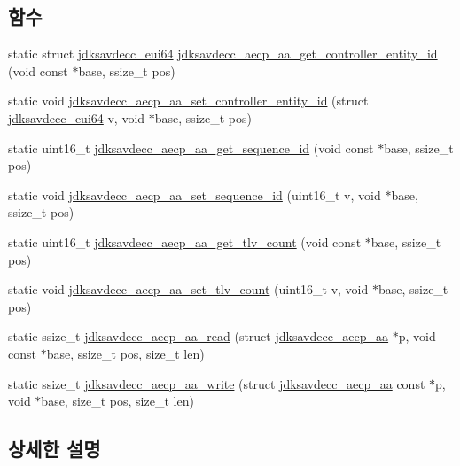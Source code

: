 \subsection*{함수}
\begin{DoxyCompactItemize}
\item 
static struct \hyperlink{structjdksavdecc__eui64}{jdksavdecc\+\_\+eui64} \hyperlink{group___a_e_c_p___a_a_gaae2a7787d4f2cac32225db085671d9fb}{jdksavdecc\+\_\+aecp\+\_\+aa\+\_\+get\+\_\+controller\+\_\+entity\+\_\+id} (void const $\ast$base, ssize\+\_\+t pos)
\item 
static void \hyperlink{group___a_e_c_p___a_a_ga16a3ac69955243c9eee453d51b6dc28a}{jdksavdecc\+\_\+aecp\+\_\+aa\+\_\+set\+\_\+controller\+\_\+entity\+\_\+id} (struct \hyperlink{structjdksavdecc__eui64}{jdksavdecc\+\_\+eui64} v, void $\ast$base, ssize\+\_\+t pos)
\item 
static uint16\+\_\+t \hyperlink{group___a_e_c_p___a_a_gaa3c8603e8ae6975ea642467349cbcb6a}{jdksavdecc\+\_\+aecp\+\_\+aa\+\_\+get\+\_\+sequence\+\_\+id} (void const $\ast$base, ssize\+\_\+t pos)
\item 
static void \hyperlink{group___a_e_c_p___a_a_ga140e64fcf3dbe04b722842e2b14ec27e}{jdksavdecc\+\_\+aecp\+\_\+aa\+\_\+set\+\_\+sequence\+\_\+id} (uint16\+\_\+t v, void $\ast$base, ssize\+\_\+t pos)
\item 
static uint16\+\_\+t \hyperlink{group___a_e_c_p___a_a_ga9bbfb30ebe22ee886ac1b783d64bd1aa}{jdksavdecc\+\_\+aecp\+\_\+aa\+\_\+get\+\_\+tlv\+\_\+count} (void const $\ast$base, ssize\+\_\+t pos)
\item 
static void \hyperlink{group___a_e_c_p___a_a_ga7e891867e553b3ff8e0e247629831afe}{jdksavdecc\+\_\+aecp\+\_\+aa\+\_\+set\+\_\+tlv\+\_\+count} (uint16\+\_\+t v, void $\ast$base, ssize\+\_\+t pos)
\item 
static ssize\+\_\+t \hyperlink{group___a_e_c_p___a_a_gacc39cba2e86bb37b72b2f300ed45e260}{jdksavdecc\+\_\+aecp\+\_\+aa\+\_\+read} (struct \hyperlink{structjdksavdecc__aecp__aa}{jdksavdecc\+\_\+aecp\+\_\+aa} $\ast$p, void const $\ast$base, ssize\+\_\+t pos, size\+\_\+t len)
\item 
static ssize\+\_\+t \hyperlink{group___a_e_c_p___a_a_ga63d1243cc1c62ab7cc8c4944a1fd2c37}{jdksavdecc\+\_\+aecp\+\_\+aa\+\_\+write} (struct \hyperlink{structjdksavdecc__aecp__aa}{jdksavdecc\+\_\+aecp\+\_\+aa} const $\ast$p, void $\ast$base, size\+\_\+t pos, size\+\_\+t len)
\end{DoxyCompactItemize}


\subsection{상세한 설명}



